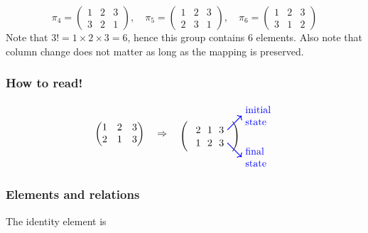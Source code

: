 \documentclass[a4paper,12pt]{article}
\theoremstyle{definition}
\begin{document}
\begin{equation*}
\pi_4 =
\begin{pmatrix}
1 & 2 & 3 \\
3 & 2 & 1
\end{pmatrix},
\quad
\pi_5 =
\begin{pmatrix}
1 & 2 & 3 \\
2 & 3 & 1
\end{pmatrix},
\quad
\pi_6 =
\begin{pmatrix}
1 & 2 & 3 \\
3 & 1 & 2
\end{pmatrix}
\end{equation*}
Note that $3! = 1\times2\times3 = 6$, hence this group contains $6$ elements. Also note that column change does not matter as long as the mapping is preserved.

\subsubsection*{How to read!}
\begin{equation*}
\begin{pmatrix}
1 & 2 & 3 \\ 
2 & 1 & 3
\end{pmatrix}
\quad
\Rightarrow
\quad
\begin{tikzpicture}[baseline=(m.center)]
  \matrix (m) [matrix of math nodes, left delimiter=(, right delimiter=)] {
    2 & 1 & 3 \\
    1 & 2 & 3 \\
  };

  \draw[->, blue, thick] (m-1-3.east) -- ++(0.5,0.5) node[right, align=left] {initial \\ state};

  \draw[->, blue, thick] (m-2-3.east) -- ++(0.5,-0.5) node[right, align=left] {final \\ state};
\end{tikzpicture}
\end{equation*}

\subsubsection*{Elements and relations}
The identity element is 
\end{document}
